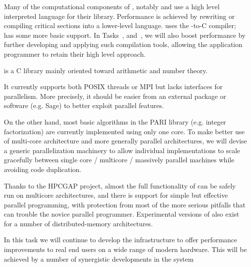 \begin{workpackage}
\begin{wpdescription}
  
  Many of the computational components of \TheProject, notably \Sage
  and \GAP use a high level
  interpreted language for their library. Performance is achieved by
  rewriting or compiling critical sections into a lower-level
  language. \Sage uses
  the \Cython \Python-to-C compiler; \GAP has some more basic support.
  In Tasks~, 
  and~, we will also boost performance by
  further developing and applying such compilation tools, allowing the
  application programmer to retain their high level approach.

\end{wpdescription}
\begin{tasklist}
\begin{task}[title=PARI,id=hpc-pari]
  \Pari is a C library mainly oriented toward arithmetic and number theory.
  
  It currently supports both POSIX threads or MPI but lacks interfaces for
  parallelism. More precisely, it should be easier from an external package
  or software (e.g. Sage) to better exploit \Pari parallel features.

  On the other hand, most basic algorithms in the PARI library (e.g. integer
  factorization) are currently implemented using only one core. To
  make better use of multi-core architecture and more generally parallel
  architectures, we will devise a generic parallelization machinery
  to allow individual implementations to scale gracefully between single
  core / multicore / massively parallel machines while avoiding code
  duplication.
\end{task}


\begin{task}[title=GAP,id=hpc-gap]
  Thanks to the HPCGAP project, almost the full functionality of \GAP
  can be safely run on multicore architectures, and there is support for
  simple but effective parallel programming, with protection from most
  of the more serious pitfalls that can trouble the novice parallel
  programmer. Experimental versions of \GAP also exist for a number of
  distributed-memory architectures.


In this task we will continue to develop the \GAP infrastructure to
offer performance improvements to real end users on a wide range of
modern hardware. This will be achieved by a number of synergistic
developments in the system


\end{task}
\end{tasklist}
\end{workpackage}
